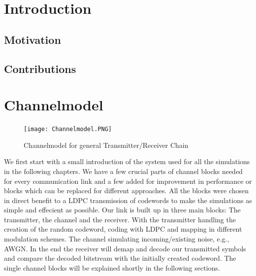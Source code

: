\documentclass[12pt,oneside, reqno]{report}
\begin{document}


\tableofcontents

\newpage
\setlength{\baselineskip}{3ex}

\begin{spacing}{1.15}
\end{spacing}
\newpage
\thispagestyle{empty}
\null

\newpage
{}
\listoffigures

%

\newpage
\thispagestyle{empty}
\null
\newpage
\chapter{Introduction}
\section{Motivation}
\section{Contributions}

\newpage
\chapter{Channelmodel}
\label{sec:channel}
\begin{figure}[H]
	\centering
	\texttt{[image: Channelmodel.PNG]}
	\caption{Channelmodel for general Transmitter/Receiver Chain}
	\label{fig:Channelmodel}
\end{figure}
We first start with a small introduction of the system used for all the simulations in the following chapters. We have a few crucial parts of channel blocks needed for every communication link and a few added for improvement in performance or blocks which can be replaced for different approaches. All the blocks were chosen in direct benefit to a LDPC transmission of codewords to make the simulations as simple and effecient as possible. 
Our link is built up in three main blocks: The transmitter, the channel and the receiver. With the transmitter handling the creation of the random codeword, coding with \gls{LDPC} and mapping in different modulation schemes. The channel simulating incoming/existing noise, e.g., \gls{AWGN}. In the end the receiver will demap and decode our transmitted symbols and compare the decoded bitstream with the initially created codeword.
\newline
The single channel blocks will be explained shortly in the following sections.
\end{document}
